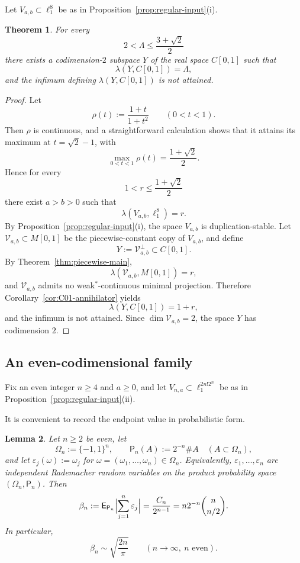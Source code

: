 \documentclass[11pt]{amsart}
\numberwithin{equation}{section}
\newtheorem{theorem}{Theorem}[section]
\newtheorem{lemma}[theorem]{Lemma}
\theoremstyle{definition}
\theoremstyle{remark}
\newcommand{\Exp}{\mathsf E}
\newcommand{\Prob}{\mathsf P}
\begin{document}
Let $V_{a,b}\subset \ell_1^8$ be as in Proposition~\ref{prop:regular-input}\textup{(i)}.

\begin{theorem}
\label{thm:codim2}
For every
\[
2<\Lambda\leqslant \frac{3+\sqrt2}{2}
\]
there exists a codimension-$2$ subspace $Y$ of the real space $C[0,1]$ such that
\[
\lambda(Y,C[0,1])=\Lambda,
\]
and the infimum defining $\lambda(Y,C[0,1])$ is not attained.
\end{theorem}

\begin{proof}
Let
\[
\rho(t):=\frac{1+t}{1+t^2}
\qquad (0<t<1).
\]
Then $\rho$ is continuous, and a straightforward calculation shows that it attains its maximum at $t=\sqrt2-1$, with
\[
\max_{0<t<1}\rho(t)=\frac{1+\sqrt2}{2}.
\]
Hence for every
\[
1<r\leqslant \frac{1+\sqrt2}{2}
\]
there exist $a>b>0$ such that
\[
\lambda(V_{a,b},\ell_1^8)=r.
\]
By Proposition~\ref{prop:regular-input}\textup{(i)}, the space $V_{a,b}$ is duplication-stable. Let $\mathscr V_{a,b}\subset M[0,1]$ be the piecewise-constant copy of $V_{a,b}$, and define
\[
Y:=\mathscr V_{a,b}^{\perp}\subset C[0,1].
\]
By Theorem~\ref{thm:piecewise-main},
\[
\lambda(\mathscr V_{a,b},M[0,1]) = r,
\]
and $\mathscr V_{a,b}$ admits no weak$^*$-continuous minimal projection. Therefore Corollary~\ref{cor:C01-annihilator} yields
\[
\lambda(Y,C[0,1]) = 1+r,
\]
and the infimum is not attained. Since $\dim \mathscr V_{a,b}=2$, the space $Y$ has codimension $2$.
\end{proof}

\subsection*{An even-codimensional family}

Fix an even integer $n\geqslant 4$ and $a\geqslant 0$, and let $V_{n,a}\subset \ell_1^{2n!2^n}$ be as in Proposition~\ref{prop:regular-input}\textup{(ii)}.

It is convenient to record the endpoint value in probabilistic form.

\begin{lemma}
\label{lem:Cn-rademacher}
Let $n\geqslant 2$ be even, let
\[
\Omega_n:=\{-1,1\}^n,
\qquad
\Prob_n(A):=2^{-n}\#A
\quad (A\subset \Omega_n),
\]
and let $\varepsilon_j(\omega):=\omega_j$ for $\omega=(\omega_1,\dots,\omega_n)\in\Omega_n$. Equivalently, $\varepsilon_1,\dots,\varepsilon_n$ are independent Rademacher random variables on the product probability space $(\Omega_n,\Prob_n)$. Then
\[
\beta_n
:=
\Exp_{\Prob_n}\Bigl|\sum_{j=1}^n \varepsilon_j\Bigr|
=
\frac{C_n}{2^{n-1}}
=
n2^{-n}\binom{n}{n/2}.
\]
In particular,
\[
\beta_n\sim \sqrt{\frac{2n}{\pi}}
\qquad (n\to\infty,\ n\text{ even}).
\]
\end{lemma}
\end{document}
